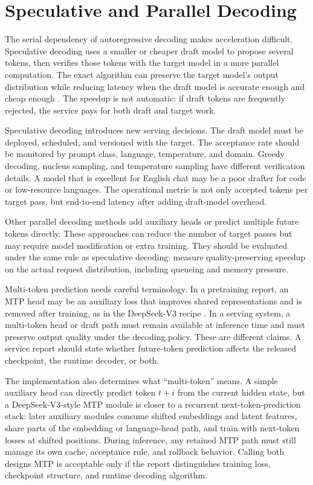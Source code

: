 \section{Speculative and Parallel Decoding}
\label{sec:speculative-decoding}

The serial dependency of autoregressive decoding makes acceleration difficult. Speculative decoding uses a smaller or cheaper draft model to propose several tokens, then verifies those tokens with the target model in a more parallel computation. The exact algorithm can preserve the target model's output distribution while reducing latency when the draft model is accurate enough and cheap enough \cite{leviathan2023fast}. The speedup is not automatic: if draft tokens are frequently rejected, the service pays for both draft and target work.

Speculative decoding introduces new serving decisions. The draft model must be deployed, scheduled, and versioned with the target. The acceptance rate should be monitored by prompt class, language, temperature, and domain. Greedy decoding, nucleus sampling, and temperature sampling have different verification details. A model that is excellent for English chat may be a poor drafter for code or low-resource languages. The operational metric is not only accepted tokens per target pass, but end-to-end latency after adding draft-model overhead.

Other parallel decoding methods add auxiliary heads or predict multiple future tokens directly. These approaches can reduce the number of target passes but may require model modification or extra training. They should be evaluated under the same rule as speculative decoding: measure quality-preserving speedup on the actual request distribution, including queueing and memory pressure.

Multi-token prediction needs careful terminology. In a pretraining report, an MTP head may be an auxiliary loss that improves shared representations and is removed after training, as in the DeepSeek-V3 recipe \cite{deepseek2024v3}. In a serving system, a multi-token head or draft path must remain available at inference time and must preserve output quality under the decoding policy. These are different claims. A service report should state whether future-token prediction affects the released checkpoint, the runtime decoder, or both.

The implementation also determines what ``multi-token'' means. A simple auxiliary head can directly predict token $t+i$ from the current hidden state, but a DeepSeek-V3-style MTP module is closer to a recurrent next-token-prediction stack: later auxiliary modules consume shifted embeddings and latent features, share parts of the embedding or language-head path, and train with next-token losses at shifted positions. During inference, any retained MTP path must still manage its own cache, acceptance rule, and rollback behavior. Calling both designs MTP is acceptable only if the report distinguishes training loss, checkpoint structure, and runtime decoding algorithm.

